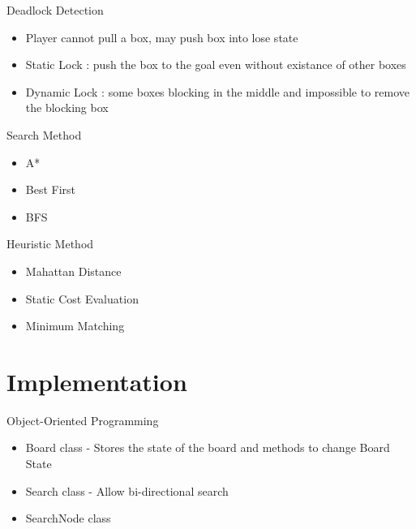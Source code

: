 \documentclass{beamer}
\begin{document}
\begin{frame}
  Deadlock Detection
  \begin{itemize}
  \item Player cannot pull a box, may push box into lose state
  \item Static Lock : push the box to the goal even without existance of other boxes
  \item Dynamic Lock : some boxes blocking in the middle and impossible to remove the blocking box

  \end{itemize}
\end{frame}

\begin{frame}
  Search Method
  \begin{itemize}
  \item A*
  \item Best First
  \item BFS
  \end{itemize}

\end{frame}

\begin{frame}
  Heuristic Method
  \begin{itemize}
  \item Mahattan Distance
  \item Static Cost Evaluation
  \item Minimum Matching
  \end{itemize}
\end{frame}

\section{Implementation}
\begin{frame}
Object-Oriented Programming
  \begin{itemize}
  \item Board class - Stores the state of the board and methods to change Board State
  \item Search class - Allow bi-directional search
  \item SearchNode class
  \end{itemize}
\end{frame}
\end{document}
